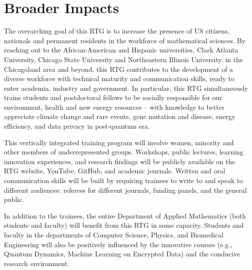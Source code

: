 \documentclass[11pt]{NSFamsart}
\begin{document}
\section{Broader Impacts} 


 


 

The overarching goal of this RTG is to increase the presence of US citizens, nationals and permanent residents in the workforce of  mathematical sciences. 
By reaching out to the African-American and Hispanic     universities,  
Clark Atlanta University, Chicago State University and Northeastern Illinois University, in the Chicagoland area and beyond, this RTG   contributes to  the development of a diverse    workforce with technical maturity and communication skills, ready to enter academia, industry and government. In particular, this RTG simultaneously trains students and postdoctoral fellows to be socially responsible for our environment, health and new energy resources -- with knowledge to better appreciate climate change and rare events, gene mutation and disease, energy efficiency, and data privacy in post-quantum era.   
   

This vertically integrated training program will involve women, minority     and other members of underrepresented groups. Workshops, public lectures, learning innovation experiences, and research findings will be publicly available on the  RTG website, YouTube, GitHub, and academic journals. Written and oral communication skills will be built by requiring trainees to write to and speak to different audiences: referees for different journals, funding panels, and the general public. 

In addition to the trainees, the entire Department of Applied Mathematics (both students and faculty) will benefit from this RTG in some capacity. Students and faculty in the departments of Computer Science, Physics, and Biomedical Engineering will also be positively influenced by the innovative courses (e.g., Quantum Dynamics, Machine Learning on Encrypted Data) and the conducive research environment. 
 
\end{document}
